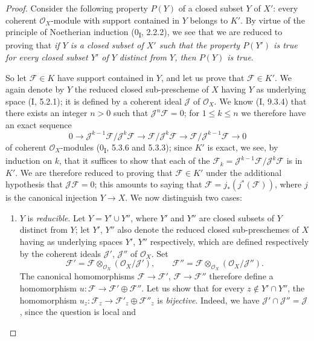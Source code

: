 \begin{proof}
Consider the following property $P(Y)$ of a closed subset $Y$ of $X'$:
every coherent $\mathcal O_X$-module with support contained in $Y$ belongs to
$K'$. By virtue of the principle of Noetherian induction (0\textsubscript{I},
2.2.2), we see that we are reduced to proving that \emph{if $Y$ is a closed
subset of $X'$ such that the property $P(Y')$ is true for every closed
subset $Y'$ of $Y$ distinct from $Y$, then $P(Y)$ is true}.

So let $\mathcal F\in K$ have support contained in $Y$, and let us prove that
$\mathcal F\in K'$. We again denote by $Y$ the reduced closed sub-prescheme of
$X$ having $Y$ as underlying space (I, 5.2.1); it is defined by a coherent
ideal $\mathcal J$ of $\mathcal O_X$. We know (I, 9.3.4) that there exists an
integer $n>0$ such that $\mathcal J^n\mathcal F=0$; for $1\leq k\leq n$ we
therefore have an exact sequence
\[
0\longrightarrow
\mathcal J^{k-1}\mathcal F/\mathcal J^k\mathcal F
\longrightarrow \mathcal F/\mathcal J^k\mathcal F
\longrightarrow \mathcal F/\mathcal J^{k-1}\mathcal F
\longrightarrow0
\]
of coherent $\mathcal O_X$-modules (0\textsubscript{I}, 5.3.6 and 5.3.3);
since $K'$ is exact, we see, by induction on $k$, that it suffices to show
that each of the
$\mathcal F_k=\mathcal J^{k-1}\mathcal F/\mathcal J^k\mathcal F$ is in
$K'$. We are therefore reduced to proving that $\mathcal F\in K'$ under the
additional hypothesis that $\mathcal J\mathcal F=0$; this amounts to saying that
$\mathcal F=j_*(j^*(\mathcal F))$, where $j$ is the canonical injection
$Y\to X$. We now distinguish two cases:
\begin{enumerate}
\item[a)] $Y$ is \emph{reducible}. Let $Y=Y'\cup Y''$, where $Y'$ and $Y''$
are closed subsets of $Y$ distinct from $Y$; let $Y'$,
$Y''$ also denote the reduced closed sub-preschemes of $X$ having as underlying
spaces $Y'$, $Y''$ respectively, which are defined respectively by
the coherent ideals $\mathcal J'$, $\mathcal J''$ of $\mathcal O_X$. Set
\[
\mathcal F'=\mathcal F\otimes_{\mathcal O_X}
(\mathcal O_X/\mathcal J'),\qquad
\mathcal F''=\mathcal F\otimes_{\mathcal O_X}
(\mathcal O_X/\mathcal J'').
\]
The canonical homomorphisms $\mathcal F\to\mathcal F'$,
$\mathcal F\to\mathcal F''$ therefore define a homomorphism
$u:\mathcal F\to\mathcal F'\oplus\mathcal F''$. Let us show that for every
$z\notin Y'\cap Y''$, the homomorphism
$u_z:\mathcal F_z\to\mathcal F'_z\oplus\mathcal F''_z$ is \emph{bijective}.
Indeed, we have $\mathcal J'\cap\mathcal J''=\mathcal J$, since the question is
local and


\end{enumerate}
\end{proof}
